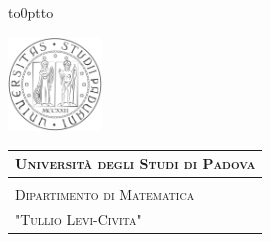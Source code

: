 \documentclass[a4paper, 12pt, twoside, openright]{book}
\begin{document}
\nocite{*}
\frontmatter

\begin{titlepage} %
\begin{center}
\vbox to0pt{\vbox to\vss}

\hspace{0.5cm}
\begin{minipage}{.20\textwidth}
  \includegraphics[height=2.5cm]{images/unipd-bn}
\end{minipage}\begin{minipage}{.90\textwidth}
  \begin{table}[H]
  \begin{tabular}{l}
  \scshape{\Large{\bfseries{Università degli Studi di Padova}}} \\
  \hline \\
  \scshape{\Large{Dipartimento di Matematica}} \\
  \scshape{\Large{"Tullio Levi-Civita"}}\\
  \end{tabular}
  \end{table}
\end{minipage}


\end{center}
\end{titlepage}
\end{document}
